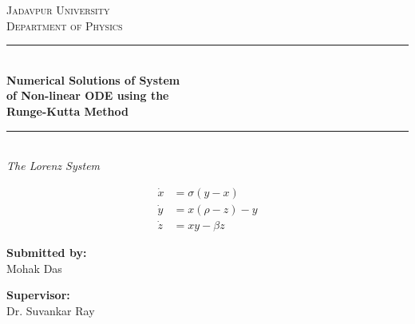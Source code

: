 \documentclass[12pt, a4paper, twoside]{article}
\begin{document}
    \begin{titlepage}
        \centering

        \vspace*{\fill}
        \Huge \textsc{\textcolor{navyblue}{Jadavpur University}}\\
        \LARGE \textsc{Department of Physics}\\[1cm]

        \textcolor{navyblue}{\rule{\linewidth}{0.8mm}} \\[0.4cm] 
        \Huge \textbf{\textcolor{navyblue}{Numerical Solutions of System \\ of Non-linear ODE using the \\ Runge-Kutta Method}} \\[0.2cm]
        \textcolor{navyblue}{\rule{\linewidth}{0.8mm}} \\[1.5cm] 

        \large \textit{The Lorenz System}\\[0.5cm]

        \begin{tcolorbox}[colback=navyblue!5!white, colframe=navyblue, width=0.8\textwidth, boxrule=0.5mm, arc=2mm, auto outer arc]
            \Large
            $$
            \begin{aligned}
            \dot{x} &= \sigma(y-x) \\
            \dot{y} &= x(\rho-z)-y \\
            \dot{z} &= xy-\beta z
            \end{aligned}
            $$
        \end{tcolorbox}

        \vspace{1.5cm}

        \noindent
        \begin{minipage}{0.4\textwidth}
            \begin{flushleft} \Large
                \textbf{Submitted by:}\\
                \textcolor{navyblue}{Mohak Das}\\
            \end{flushleft}
        \end{minipage}
        \begin{minipage}{0.4\textwidth}
            \begin{flushright} \Large
                \textbf{Supervisor:} \\
                Dr. Suvankar Ray\\
                \vspace{0.6cm}
            \end{flushright}
        \end{minipage}
        \vspace{1cm}


\end{titlepage}
\end{document}
